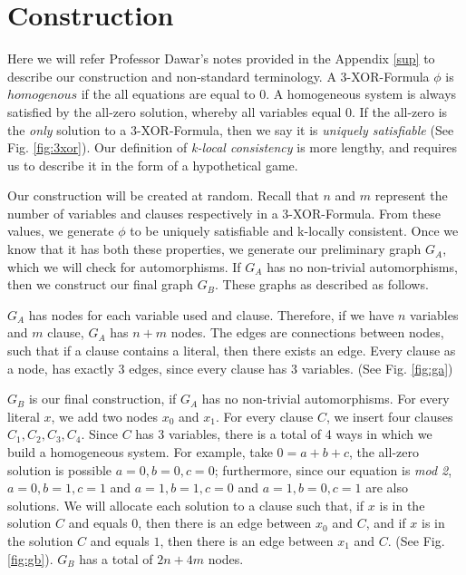 \newpage
\section[Construction]{Construction}
Here we will refer Professor Dawar's notes provided in the Appendix \ref{sup} to describe our construction and non-standard terminology. A 3-XOR-Formula $\phi$ is $homogenous$ if the all equations are equal to 0. A homogeneous system is always satisfied by the all-zero solution, whereby all variables equal 0. If the all-zero is the \emph{only} solution to a 3-XOR-Formula, then we say it is \emph{uniquely satisfiable} (See Fig. \ref{fig:3xor}). Our definition of \emph{k-local consistency} is more lengthy, and requires us to describe it in the form of a hypothetical game.
\par
Our construction will be created at random. Recall that $n$ and $m$ represent the number of variables and clauses respectively in a 3-XOR-Formula. From these values, we generate $\phi$ to be uniquely satisfiable and k-locally consistent. Once we know that it has both these properties, we generate our preliminary graph $G_A$, which we will check for automorphisms. If $G_A$ has no non-trivial automorphisms, then we construct our final graph $G_B$. These graphs as described as follows. 
\par
$G_A$ has nodes for each variable used and clause. Therefore, if we have $n$ variables and $m$ clause, $G_A$ has $n+m$ nodes. The edges are connections between nodes, such that if a clause contains a literal, then there exists an edge. Every clause as a node, has exactly 3 edges, since every clause has 3 variables. (See Fig. \ref{fig:ga})
\par
$G_B$ is our final construction, if $G_A$ has no non-trivial automorphisms. For every literal $x$, we add two nodes $x_{0}$ and $x_{1}$. For every clause $C$, we insert four clauses $C_{1}, C_{2}, C_{3}, C_{4}$. Since $C$ has 3 variables, there is a total of 4 ways in which we build a homogeneous system. For example, take $0=a+b+c$, the all-zero solution is possible $a=0,b=0,c=0$; furthermore, since our equation is \emph{mod 2}, $a=0,b=1,c=1$ and $a=1,b=1,c=0$ and $a=1,b=0,c=1$ are also solutions. We will allocate each solution to a clause such that, if $x$ is in the solution $C$ and equals $0$, then there is an edge between $x_0$ and $C$, and if $x$ is in the solution $C$ and equals $1$, then there is an edge between $x_1$ and $C$. (See Fig. \ref{fig:gb}). $G_{B}$ has a total of $2n+4m$ nodes.
